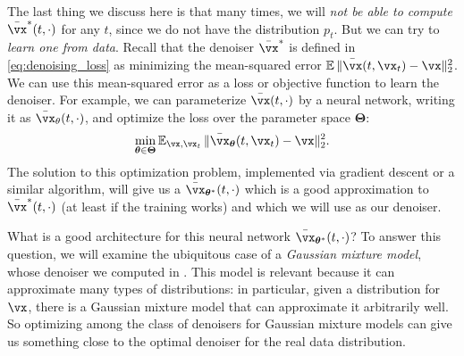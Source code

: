 \documentclass[../../book-main.tex]{subfiles}
\begin{document}
The last thing we discuss here is that many times, we will \textit{not be able to compute} \(\bar{\vx}^{\ast}(t, \cdot)\) for any \(t\), since we do not have the distribution \(p_{t}\). But we can try to \textit{learn one from data}. Recall that the denoiser \(\bar{\vx}^{\ast}\) is defined in \eqref{eq:denoising_loss} as minimizing the mean-squared error \(\Ex\norm{\bar{\vx}(t, \vx_{t}) - \vx}_{2}^{2}\). We can use this mean-squared error as a loss or objective function to learn the denoiser. For example, we can parameterize \(\bar{\vx}(t, \cdot)\) by a neural network, writing it as \(\bar{\vx}_{\theta}(t, \cdot)\), and optimize the loss over the parameter space \(\bm\Theta\):
\begin{equation}
	\min_{\bm \theta \in \bm \Theta}\Ex_{\vx, \vx_{t}}\norm{\bar{\vx}_{\bm\theta}(t, \vx_{t}) - \vx}_{2}^{2}.
\end{equation}
The solution to this optimization problem, implemented via gradient descent or a similar algorithm, will give us a \(\bar{\vx}_{\bm\theta^{\ast}}(t, \cdot)\) which is a good approximation to \(\bar{\vx}^{\ast}(t, \cdot)\) (at least if the training works) and which we will use as our denoiser.

What is a good architecture for this neural network \(\bar{\vx}_{\bm\theta^{\ast}}(t, \cdot)\)? To answer this question, we will examine the ubiquitous case of a \textit{Gaussian mixture model},  whose denoiser we computed in . This model is relevant because it can approximate many types of distributions: in particular, given a distribution for \(\vx\), there is a Gaussian mixture model that can approximate it arbitrarily well. So optimizing among the class of denoisers for Gaussian mixture models can give us something close to the optimal denoiser for the real data distribution. 
\end{document}
